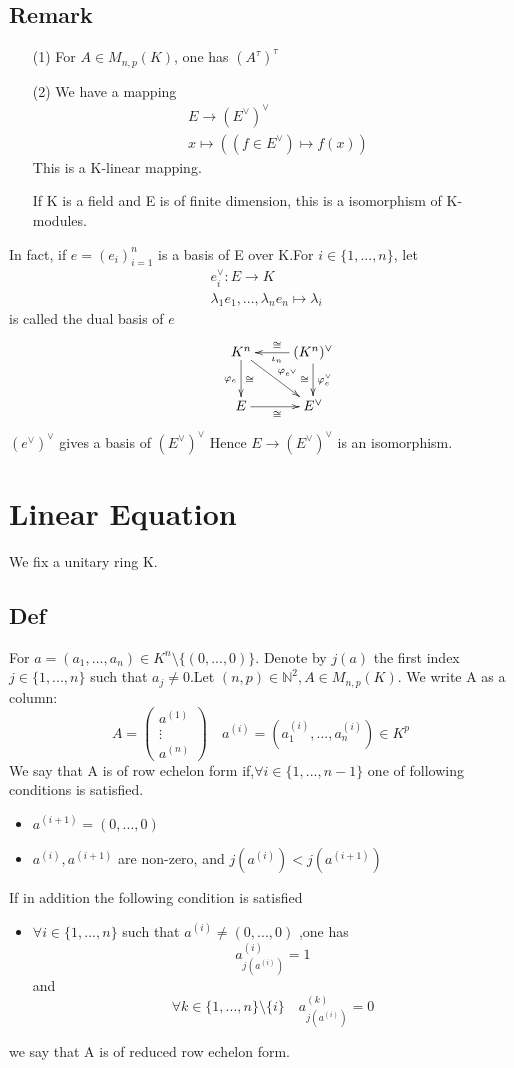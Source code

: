 \documentclass{book}
\begin{document}
\section{Remark}
\begin{itemize}
    \item [(1)]For $A\in M_{n,p}(K) $, one has $(A^\tau)^\tau$
    \item [(2)]We have a mapping $$\begin{aligned}
        &E\rightarrow(E^\vee)^\vee\\
        &x\mapsto((f\in E^\vee)\mapsto f(x))
    \end{aligned}$$
    This is a K-linear mapping.

    If K is a field and E is of finite dimension, this is a isomorphism of K-modules.
\end{itemize}
In fact, if $e=(e_i)_{i=1}^n$ is a basis of E over K.For $i\in \{1,...,n\}$, let $$\begin{aligned}
    & e_i^\vee:E\rightarrow K\\
    & \lambda_1e_1,...,\lambda_ne_n\mapsto\lambda_i
\end{aligned}$$
is called the dual basis of $e$
$$\xymatrix{
    & K^n  \ar[d]^\cong_{\varphi_e} \ar[rd]^{\varphi_{e^\vee}} &(K^n)^\vee\ar[l]_\cong^{\iota_n}\ar[d]_\cong^{\varphi_e^\vee}\\
    & E\ar[r]_\cong & E^\vee
}$$
$(e^\vee)^\vee$ gives a basis of $(E^\vee)^\vee$ Hence $E\rightarrow(E^\vee)^\vee$ is an isomorphism.
\chapter{Linear Equation}
We fix a unitary ring K.
\section{Def}
For $a=(a_1,...,a_n)\in K^n\setminus\{(0,...,0)\}$. Denote by $j(a)$ the first index $j\in \{1,...,n\}$ such that $a_j\not=0$.Let $(n,p)\in \mathbb{N}^2, A\in M_{n,p}(K)$. We write A as a column:$$A=\left(\begin{aligned}
    a^{(1)}\\\vdots\\a^{(n)}
\end{aligned}\right)\quad a^{(i)}=(a^{(i)}_1,...,a^{(i)}_n)\in K^p$$
We say that A is of row echelon form if,$\forall i\in \{1,...,n-1\}$ one of following conditions is satisfied.
\begin{itemize}
    \item $a^{(i+1)}=(0,...,0)$
    \item $a^{(i)},a^{(i+1)}$ are non-zero, and $j(a^{(i)})<j(a^{(i+1)})$
\end{itemize}
If in addition the following condition is satisfied
\begin{itemize}
    \item $\forall i\in \{1,...,n\}$ such that $a^{(i)}\not=(0,...,0)$ ,one has $$a^{(i)}_{j(a^{(i)})}=1$$ and $$\forall k\in \{1,...,n\}\setminus\{i\}\quad a^{(k)}_{j(a^{(i)})}=0$$
\end{itemize}
we say that A is of reduced row echelon form.\
\end{document}
